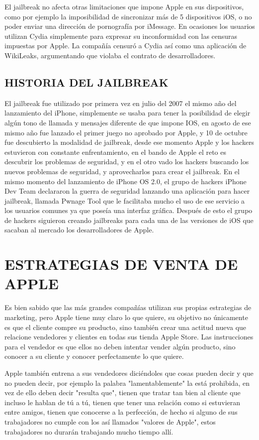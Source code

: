 El jailbreak no afecta otras limitaciones que impone Apple en
sus dispositivos, como por ejemplo la imposibilidad de
sincronizar más de 5 dispositivos iOS, o no poder enviar una
dirección de pornografía por iMessage. En ocasiones los
usuarios utilizan Cydia simplemente para expresar su
inconformidad con las censuras impuestas por Apple. La
compañía censuró a Cydia así como una aplicación de
WikiLeaks, argumentando que violaba el contrato de
desarrolladores.

\subsection*{HISTORIA DEL JAILBREAK}

El jailbreak fue utilizado por primera vez en julio del 2007 el
mismo año del lanzamiento del iPhone, simplemente se usaba
para tener la posibilidad de elegir algún tono de llamada y
mensajes diferente de que impone IOS, en agosto de ese mismo
año fue lanzado el primer juego no aprobado por Apple, y 10 de
octubre fue descubierto la modalidad de jailbreak, desde ese
momento Apple y los hackers estuvieron con constante
enfrentamiento, en el bando de Apple el reto es descubrir los
problemas de seguridad, y en el otro vado los hackers buscando
los nuevos problemas de seguridad, y aprovecharlos para crear
el jailbreak. En el mismo momento del lanzamiento de iPhone
OS 2.0, el grupo de hackers iPhone Dev Team declararon la
guerra de seguridad lanzando una aplicación para hacer
jailbreak, llamada Pwnage Tool que le facilitaba mucho el uso de
ese servicio a los usuarios comunes ya que poseía una interfaz
gráfica. Después de esto el grupo de hackers siguieron creando
jailbreaks para cada una de las versiones de iOS que sacaban al
mercado los desarrolladores de Apple.

\section*{ESTRATEGIAS DE VENTA DE APPLE}

Es bien sabido que las más grandes compañías utilizan sus
propias estrategias de marketing, pero Apple tiene muy claro lo
que quiere, su objetivo no únicamente es que el cliente compre
su producto, sino también crear una actitud nueva que relacione
vendedores y clientes en todas sus tienda Apple Store. Las
instrucciones para el vendedor es que ellos no deben intentar
vender algún producto, sino conocer a su cliente y conocer
perfectamente lo que quiere.

Apple también entrena a sus vendedores diciéndoles que cosas
pueden decir y que no pueden decir, por ejemplo la palabra
"lamentablemente" la está prohibida, en vez de ello deben decir
"resulta que", tienen que tratar tan bien al cliente que incluso le
hablan de tú a tú, tienen que tener una relación como si
estuvieran entre amigos, tienen que conocerse a la perfección,
de hecho si alguno de sus trabajadores no cumple con los así
llamados "valores de Apple", estos trabajadores no durarán
trabajando mucho tiempo allí.

